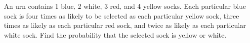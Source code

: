 An urn contains 1 blue, 2 white, 3 red, and 4 yellow socks. Each particular blue sock is four times as likely to be selected as each particular yellow sock, three times as likely as each particular red sock, and twice as likely as each particular white sock. Find the probability that the selected sock is yellow or white.
